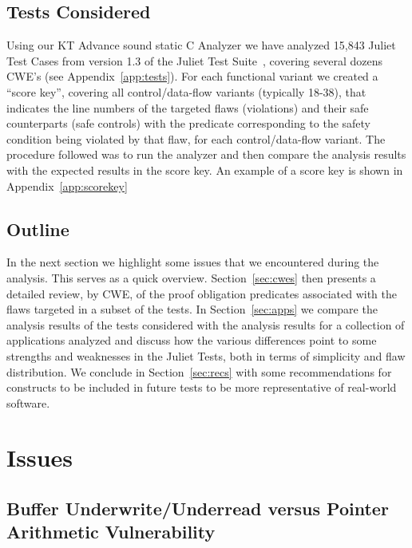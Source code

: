 \documentclass[11pt]{article}
\begin{document}
\subsection{Tests Considered}
Using our KT Advance sound static C Analyzer we have analyzed 15,843 Juliet Test 
Cases from version  1.3 of the Juliet Test Suite~\cite{NIST1995}, 
covering several dozens CWE's (see Appendix~\ref{app:tests}). For each
functional variant we created a ``score key'', covering all control/data-flow
variants (typically 18-38), that indicates the line numbers of the targeted flaws
(violations) and their safe counterparts (safe controls) with the predicate
corresponding to the safety condition being violated by that flaw, for each 
control/data-flow variant. The procedure followed was to run the analyzer and
then compare the analysis results with the expected results in the score key.
An example of a score key is shown in Appendix~\ref{app:scorekey}

\subsection{Outline}
In the next section we highlight some issues that we encountered during the
analysis. This serves as a quick overview. Section~\ref{sec:cwes} then presents
a detailed review, by CWE, of the proof obligation predicates associated with
the flaws targeted in a subset of the tests. In Section~\ref{sec:apps} we compare
the analysis results of the tests considered with the analysis results for a
collection of applications analyzed and discuss how the various differences
point to some strengths and weaknesses in the Juliet Tests, both in terms of
simplicity and flaw distribution. We conclude in Section~\ref{sec:recs}
with some recommendations for constructs to be included in future tests to
be more representative of real-world software.

\section{Issues}

\subsection{Buffer Underwrite/Underread versus Pointer Arithmetic Vulnerability}
\end{document}
